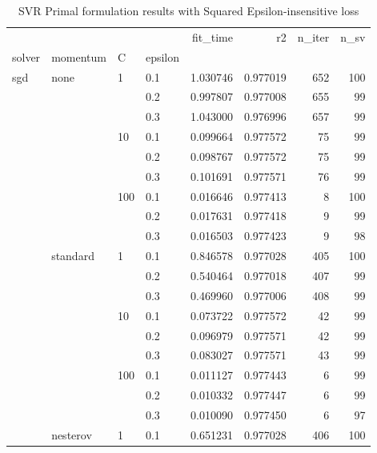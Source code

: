 \begin{table}[H]
\centering
\caption{SVR Primal formulation results with Squared Epsilon-insensitive loss}
\label{primal_svr_squared_eps_cv_results}
\begin{tabular}{llllrrrr}
\toprule
          &   &     &     &  fit\_time &        r2 &  n\_iter &  n\_sv \\
solver & momentum & C & epsilon &           &           &         &       \\
\midrule
sgd & none & 1   & 0.1 &  1.030746 &  0.977019 &     652 &   100 \\
          &   &     & 0.2 &  0.997807 &  0.977008 &     655 &    99 \\
          &   &     & 0.3 &  1.043000 &  0.976996 &     657 &    99 \\
          &   & 10  & 0.1 &  0.099664 &  0.977572 &      75 &    99 \\
          &   &     & 0.2 &  0.098767 &  0.977572 &      75 &    99 \\
          &   &     & 0.3 &  0.101691 &  0.977571 &      76 &    99 \\
          &   & 100 & 0.1 &  0.016646 &  0.977413 &       8 &   100 \\
          &   &     & 0.2 &  0.017631 &  0.977418 &       9 &    99 \\
          &   &     & 0.3 &  0.016503 &  0.977423 &       9 &    98 \\
          & standard & 1   & 0.1 &  0.846578 &  0.977028 &     405 &   100 \\
          &   &     & 0.2 &  0.540464 &  0.977018 &     407 &    99 \\
          &   &     & 0.3 &  0.469960 &  0.977006 &     408 &    99 \\
          &   & 10  & 0.1 &  0.073722 &  0.977572 &      42 &    99 \\
          &   &     & 0.2 &  0.096979 &  0.977571 &      42 &    99 \\
          &   &     & 0.3 &  0.083027 &  0.977571 &      43 &    99 \\
          &   & 100 & 0.1 &  0.011127 &  0.977443 &       6 &    99 \\
          &   &     & 0.2 &  0.010332 &  0.977447 &       6 &    99 \\
          &   &     & 0.3 &  0.010090 &  0.977450 &       6 &    97 \\
          & nesterov & 1   & 0.1 &  0.651231 &  0.977028 &     406 &   100 \\

\end{tabular}
\end{table}
